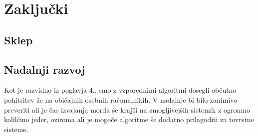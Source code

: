 \documentclass[a4paper,12pt,openright]{book}
\begin{document}
\chapter{Zaključki}

\section{Sklep}

\section{Nadalnji razvoj}

Kot je razvidno iz poglavja 4., smo z vzporednimi algoritmi dosegli občutno pohitritev že na običajnih osebnih računalnikih. V nadalnje bi bilo zanimivo preveriti ali je čas izvajanja morda še krajši na zmogljivejših sistemih z ogromno kolilčino jeder, oziroma ali je mogoče algoritme še dodatno prilagoditi za tovrstne sisteme. 



\raggedright




\printbibliography[heading=bibintoc,title={Literatura}]
\end{document}
